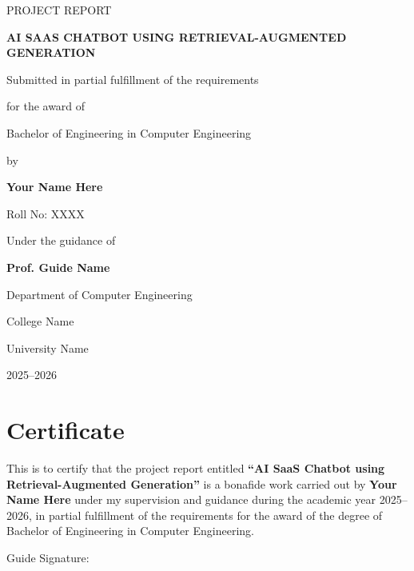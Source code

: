 \documentclass[12pt,letterpaper]{report}
\begin{document}
\begin{titlepage}
    \centering
    {\Large PROJECT REPORT\par}
    \vspace{1.2cm}
    {\huge\bfseries AI SAAS CHATBOT USING RETRIEVAL-AUGMENTED GENERATION\par}
    \vspace{1.2cm}
    {\Large Submitted in partial fulfillment of the requirements\par}
    {\Large for the award of\par}
    \vspace{0.6cm}
    {\Large Bachelor of Engineering in Computer Engineering\par}
    \vspace{1.2cm}
    {\large by\par}
    \vspace{0.3cm}
    {\Large\bfseries Your Name Here\par}
    {\large Roll No: XXXX\par}
    \vspace{1.2cm}
    {\large Under the guidance of\par}
    {\Large\bfseries Prof. Guide Name\par}
    \vfill
    {\Large Department of Computer Engineering\par}
    {\Large College Name\par}
    {\Large University Name\par}
    \vspace{0.6cm}
    {\Large 2025--2026\par}
\end{titlepage}

\chapter*{Certificate}
This is to certify that the project report entitled \textbf{``AI SaaS Chatbot using Retrieval-Augmented Generation''} is a bonafide work carried out by \textbf{Your Name Here} under my supervision and guidance during the academic year 2025--2026, in partial fulfillment of the requirements for the award of the degree of Bachelor of Engineering in Computer Engineering.

\vspace{2cm}
\noindent Guide Signature: \hrulefill
\end{document}
